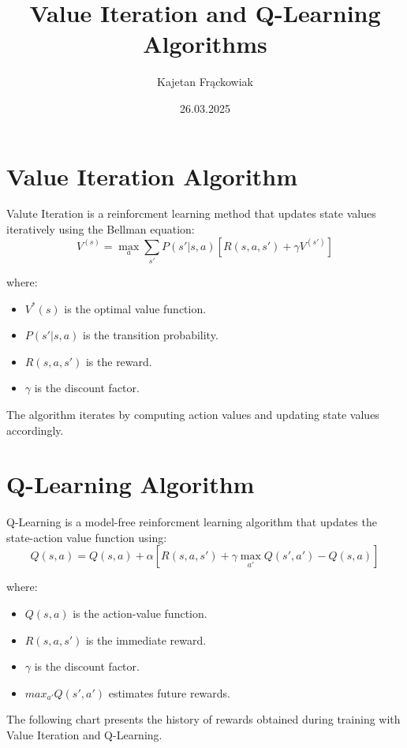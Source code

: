 \documentclass{article}
\begin{document}
\title{Value Iteration and Q-Learning Algorithms}
\author{Kajetan Frąckowiak}
\date{26.03.2025}
\maketitle

\section{Value Iteration Algorithm}
Valute Iteration is a reinforcment learning method that updates state values iteratively using the Bellman equation:
\begin{equation}
    V^(s) = \max_a \sum_{s'} P(s'|s, a) \left[R(s, a, s') + \gamma V^(s')\right]
\end{equation}

where: \begin{itemize}
    \item $V^*(s)$ is the optimal value function. \item $P(s'|s, a)$ is the transition probability.
    \item $R(s, a, s')$ is the reward.
    \item $\gamma$ is the discount factor.
\end{itemize}

The algorithm iterates by computing action values and updating state values accordingly.

\section{Q-Learning Algorithm}
Q-Learning is a model-free reinforcment learning algorithm that updates the state-action value function using:
\begin{equation}
    Q(s, a) = Q(s, a) + \alpha \left[R(s, a, s') + \gamma \max_{a'} Q(s', a') - Q(s, a)\right]
\end{equation}

where: \begin{itemize}
    \item $Q(s, a)$ is the action-value function.
    \item $R(s, a, s')$ is the immediate reward.
    \item $\gamma$ is the discount factor.
    \item $max_{a'} Q(s', a')$ estimates future rewards.
\end{itemize}

The following chart presents the history of rewards obtained during training with Value Iteration and Q-Learning.
\end{document}
